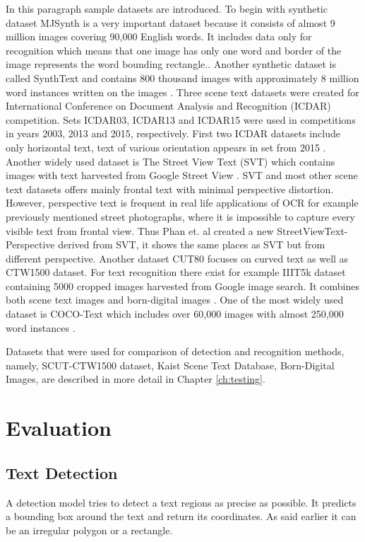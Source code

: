 In this paragraph sample datasets are introduced. To begin with synthetic dataset MJSynth is a very important dataset because it consists of almost 9 million images covering 90,000 English words. It includes data only for recognition which means that one image has only one word and border of the image  represents the word bounding rectangle.\cite{mjsynth}. Another synthetic dataset is called SynthText and contains 800 thousand images with approximately 8 million word instances written on the images \cite{synthtext}. Three scene text datasets were created for International Conference on Document Analysis and Recognition (ICDAR) competition. Sets ICDAR03, ICDAR13 and ICDAR15 were used in competitions in years 2003, 2013 and 2015, respectively. First two ICDAR datasets include only horizontal text, text of various orientation appears  in set from 2015 \cite{raisi2020text}. Another widely used dataset is The Street View Text (SVT) which contains images with text harvested from Google Street View \cite{svt}. SVT and most other scene text datasets offers mainly frontal text with minimal perspective distortion. However, perspective text is frequent in real life applications of OCR for example previously mentioned street photographs, where it is impossible to capture every visible text from frontal view. Thus Phan et. al \cite{svtp} created a new StreetViewText-Perspective derived from SVT, it shows the same places as SVT but from different perspective. Another dataset CUT80 focuses on curved text as well as CTW1500 dataset. For text recognition there exist for example IIIT5k dataset containing 5000 cropped images harvested from Google image search. It combines both scene text images and born-digital images \cite{IIIT}. One of the most widely used dataset is COCO-Text which includes over 60,000 images with almost 250,000 word instances \cite{coco}.

Datasets that were used for comparison of detection and recognition methods, namely, SCUT-CTW1500 dataset, Kaist Scene Text Database, Born-Digital Images, are described in more detail in Chapter \ref{ch:testing}. 

\section{Evaluation}
\label{sec:eval}

\subsection*{Text Detection}
A detection model tries to detect a text regions as precise as possible. It predicts a bounding box around the text and return its coordinates. As said earlier it can be an irregular polygon or a rectangle.

